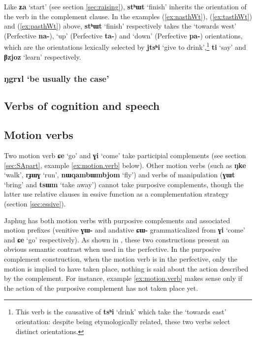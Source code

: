 \documentclass[oneside,a4paper,11pt]{article}
\newcommand{\ipa}[1]{\textbf{\phon#1}} %
\newcommand{\jpg}[2]{\ipa{#1} `#2'} %
\begin{document}
Like \jpg{ʑa}{start} (see section \ref{sec:raising}), \jpg{stʰɯt}{finish} inherits the orientation of the verb in the complement clause. In the examples (\ref{ex:nasthWt}),  (\ref{ex:tasthWt}) and (\ref{ex:pasthWt}) above, \jpg{stʰɯt}{finish} respectively takes the `towards west' (Perfective \ipa{na-}), `up' (Perfective \ipa{ta-}) and `down' (Perfective \ipa{pa-}) orientations, which are the orientations lexically selected by \jpg{jtsʰi}{give to drink},\footnote{This verb is the causative of \jpg{tsʰi}{drink} which take the `towards east' orientation: despite being etymologically related, these two verbs select distinct orientations.}  \jpg{ti}{say} and \jpg{βzjoz}{learn} respectively.


\subsubsection{\jpg{ŋgrɤl}{be usually the case}}
   \subsection{Verbs of cognition and speech} \label{sec:cognition}
  
  \subsection{Motion verbs}
Two motion verb \jpg{ɕe}{go} and \jpg{ɣi}{come} take participial complements (see section \ref{sec:SApart}, example \ref{ex:motion.verb} below). Other motion verbs (such as \jpg{ŋke}{walk}, \jpg{rɟɯɣ}{run}, \jpg{nɯqambɯmbjom}{fly})  and verbs of manipulation (\jpg{ɣɯt}{bring} and \jpg{tsɯm}{take away}) cannot take purposive complements, though the latter use relative clauses in essive function as a complementation strategy (section \ref{sec:essive}).
 
Japhug has both motion verbs with purposive complements and associated motion  prefixes (venitive \ipa{ɣɯ-}  and andative \ipa{ɕɯ-} grammaticalized from \jpg{ɣi}{come} and  \jpg{ɕe}{go} respectively). As shown in \citet[203]{jacques13harmonization}, these two constructions present an obvious semantic contrast when used in the perfective. In the purposive complement construction, when the motion verb is in the perfective, only the motion is implied to have taken place, nothing is said about the action described by the  complement. For instance, example \ref{ex:motion.verb} makes sense only if the action of the purposive complement has not taken place yet.
\end{document}
